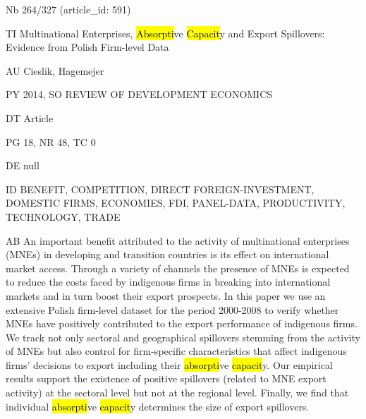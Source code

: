 \documentclass[a4paper]{article}
\begin{document}
\vspace*{-2cm}
Nb \tabto{0cm}264/327 (article\_id: 591)\par
TI \tabto{0cm}Multinational Enterprises, \hl{Absorpti}ve \hl{Capacit}y and Export Spillovers: Evidence from Polish Firm-level Data\par
AU \tabto{0cm}Cieslik, Hagemejer\par
PY \tabto{0cm}2014, SO REVIEW OF DEVELOPMENT ECONOMICS\par
DT \tabto{0cm}Article\par
PG \tabto{0cm}18, NR 48, TC 0\par
DE \tabto{0cm}null\par
ID \tabto{0cm}BENEFIT, COMPETITION, DIRECT FOREIGN-INVESTMENT, DOMESTIC FIRMS, ECONOMIES, FDI, PANEL-DATA, PRODUCTIVITY, TECHNOLOGY, TRADE\par
AB \tabto{0cm}An important benefit attributed to the activity of multinational enterprises (MNEs) in developing and transition countries is its effect on international market access. Through a variety of channels the presence of MNEs is expected to reduce the costs faced by indigenous firms in breaking into international markets and in turn boost their export prospects. In this paper we use an extensive Polish firm-level dataset for the period 2000-2008 to verify whether MNEs have positively contributed to the export performance of indigenous firms. We track not only sectoral and geographical spillovers stemming from the activity of MNEs but also control for firm-specific characteristics that affect indigenous firms' decisions to export including their \hl{absorpti}ve \hl{capacit}y. Our empirical results support the existence of positive spillovers (related to MNE export activity) at the sectoral level but not at the regional level. Finally, we find that individual \hl{absorpti}ve \hl{capacit}y determines the size of export spillovers.\par
\clearpage
\end{document}
